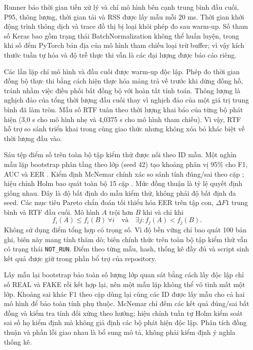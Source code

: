 \documentclass[10pt,journal,onecolumn,a4paper]{IEEEtran}
\begin{document}
Runner báo thời gian tiền xử lý và chỉ mô hình bên cạnh trung bình đầu cuối, P95, thông lượng, thời gian tải và RSS được lấy mẫu mỗi 20 ms. Thời gian khởi động trình thông dịch và trace đồ thị bị loại khỏi phép đo sau warm-up. Số tham số Keras bao gồm trạng thái BatchNormalization không thể huấn luyện, trong khi số đếm PyTorch bản địa của mô hình tham chiếu loại trừ buffer; vì vậy kích thước tuần tự hóa và độ trễ thực thi vẫn là các đại lượng được báo cáo riêng.

Các lần lặp chỉ mô hình và đầu cuối được warm-up độc lập. Phép đo thời gian đồng bộ thực thi bằng cách hiện thực hóa mảng trả về trước khi dừng đồng hồ, tránh nhầm việc điều phối bất đồng bộ với hoàn tất tính toán. Thông lượng là nghịch đảo của tổng thời lượng đầu cuối thay vì nghịch đảo của một giá trị trung bình đã làm tròn. Mẫu số RTF tuân theo thời lượng khai báo của từng bộ phát hiện (3,0 s cho mô hình nhẹ và 4,0375 s cho mô hình tham chiếu). Vì vậy, RTF hỗ trợ so sánh triển khai trong cùng giao thức nhưng không xóa bỏ khác biệt về thời lượng đầu vào.

Sáu tệp điểm số trên toàn bộ tập kiểm thử được nối theo ID mẫu. Một nghìn mẫu lặp bootstrap phân tầng theo lớp (seed 42) tạo khoảng phân vị 95\% cho F1, AUC và EER \cite{efron1979bootstrap}. Kiểm định McNemar chính xác so sánh tính đúng/sai theo cặp \cite{mcnemar1947}; hiệu chỉnh Holm bao quát toàn bộ 15 cặp \cite{holm1979}. Mức đồng thuận là tỷ lệ quyết định giống nhau. Đây là độ bất định do mẫu kiểm thử, không phải độ bất định đa seed. Các mục tiêu Pareto chẩn đoán tối thiểu hóa EER trên tập con, $\Delta F1$ trung bình và RTF đầu cuối. Mô hình $A$ trội hơn $B$ khi và chỉ khi
\begin{equation}
f_i(A)\le f_i(B)\ \forall i\quad\text{và}\quad\exists j:f_j(A)<f_j(B).
\label{eq:pareto}
\end{equation}
Không sử dụng điểm tổng hợp có trọng số. Vì độ bền vững chỉ bao quát 100 bản ghi, biên này mang tính thăm dò; biên chính thức trên toàn bộ tập kiểm thử vẫn có trạng thái \texttt{NOT\_RUN}. Điểm theo từng mẫu, hash, thống kê đầy đủ và script sinh kết quả được giữ trong phần bổ trợ của repository.

Lấy mẫu lại bootstrap bảo toàn số lượng lớp quan sát bằng cách lấy độc lập chỉ số REAL và FAKE rồi kết hợp lại, nên một mẫu lặp không thể vô tình mất một lớp. Khoảng sai khác F1 theo cặp dùng lại cùng các ID được lấy mẫu cho cả hai mô hình để bảo toàn tính phụ thuộc. McNemar chỉ đếm các kết quả đúng/sai bất đồng và kiểm tra tính đối xứng theo hướng; hiệu chỉnh tuần tự Holm kiểm soát sai số họ kiểm định mà không giả định các bộ phát hiện độc lập. Phân tích đồng thuận và phần lỗi giao nhau là bổ sung mô tả, không phải kiểm định ý nghĩa thống kê.
\end{document}
